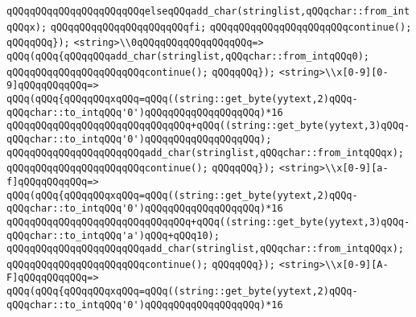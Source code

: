 \verb|qQQqqQQqqQQqqQQqqQQqqQQqelseqQQqadd_char(stringlist,qQQqchar::from_intqQQqx);|\newline
\verb|qQQqqQQqqQQqqQQqqQQqqQQqfi;|\newline
\verb|qQQqqQQqqQQqqQQqqQQqqQQqcontinue();|\newline
\verb|qQQqqQQq});|\newline
\newline
\verb|<string>\\0qQQqqQQqqQQqqQQqqQQq=>|\newline
\verb|qQQq(qQQq{qQQqqQQqadd_char(stringlist,qQQqchar::from_intqQQq0);|\newline
\verb|qQQqqQQqqQQqqQQqqQQqqQQqcontinue();|\newline
\verb|qQQqqQQq});|\newline
\newline
\verb|<string>\\x[0-9][0-9]qQQqqQQqqQQq=>|\newline
\verb|qQQq(qQQq{qQQqqQQqxqQQq=qQQq((string::get_byte(yytext,2)qQQq-qQQqchar::to_intqQQq'0')qQQqqQQqqQQqqQQqqQQq)*16|\newline
\verb|qQQqqQQqqQQqqQQqqQQqqQQqqQQqqQQq+qQQq((string::get_byte(yytext,3)qQQq-qQQqchar::to_intqQQq'0')qQQqqQQqqQQqqQQqqQQq);|\newline
\verb|qQQqqQQqqQQqqQQqqQQqqQQqadd_char(stringlist,qQQqchar::from_intqQQqx);|\newline
\verb|qQQqqQQqqQQqqQQqqQQqqQQqcontinue();|\newline
\verb|qQQqqQQq});|\newline
\verb|<string>\\x[0-9][a-f]qQQqqQQqqQQq=>|\newline
\verb|qQQq(qQQq{qQQqqQQqxqQQq=qQQq((string::get_byte(yytext,2)qQQq-qQQqchar::to_intqQQq'0')qQQqqQQqqQQqqQQqqQQq)*16|\newline
\verb|qQQqqQQqqQQqqQQqqQQqqQQqqQQqqQQq+qQQq((string::get_byte(yytext,3)qQQq-qQQqchar::to_intqQQq'a')qQQq+qQQq10);|\newline
\verb|qQQqqQQqqQQqqQQqqQQqqQQqadd_char(stringlist,qQQqchar::from_intqQQqx);|\newline
\verb|qQQqqQQqqQQqqQQqqQQqqQQqcontinue();|\newline
\verb|qQQqqQQq});|\newline
\verb|<string>\\x[0-9][A-F]qQQqqQQqqQQq=>|\newline
\verb|qQQq(qQQq{qQQqqQQqxqQQq=qQQq((string::get_byte(yytext,2)qQQq-qQQqchar::to_intqQQq'0')qQQqqQQqqQQqqQQqqQQq)*16|\newline
